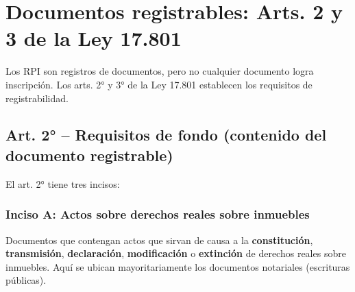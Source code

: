 \documentclass[12pt,oneside]{book}
\begin{document}

\chapter{Documentos registrables: Arts. 2 y 3 de la Ley 17.801}
\label{chap:documentos-registrables}

Los RPI son registros de documentos, pero no cualquier documento logra inscripción. Los arts. 2° y 3° de la Ley 17.801 establecen los requisitos de registrabilidad.

\section{Art. 2° -- Requisitos de fondo (contenido del documento registrable)}
\label{sec:articulo2}

El art. 2° tiene tres incisos:

\subsection{Inciso A: Actos sobre derechos reales sobre inmuebles}
\label{subsec:inciso-a}

Documentos que contengan actos que sirvan de causa a la \textbf{constitución}, \textbf{transmisión}, \textbf{declaración}, \textbf{modificación} o \textbf{extinción} de derechos reales sobre inmuebles. Aquí se ubican mayoritariamente los documentos notariales (escrituras públicas).
\end{document}
